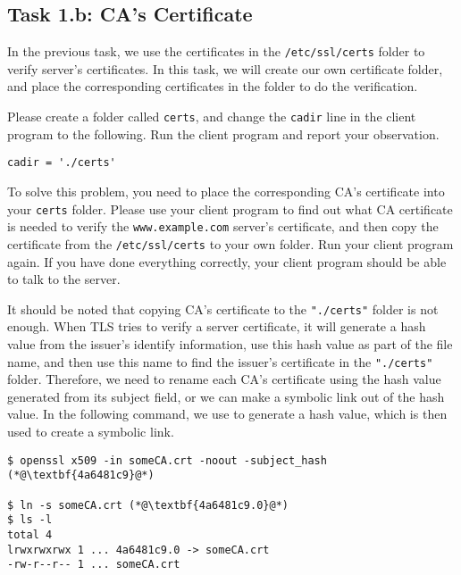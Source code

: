 \subsection{Task 1.b: CA's Certificate}

In the previous task, we use the certificates in
the \texttt{/etc/ssl/certs} folder to verify server's certificates. In this task,
we will create our own certificate folder, and place the corresponding 
certificates in the folder to do the verification.


Please create a folder called \texttt{certs}, and change the 
\texttt{cadir} line in the client program to the following. Run the client program
and report your observation.

\begin{lstlisting}
cadir = './certs'   
\end{lstlisting}


To solve this problem, you need to place the corresponding CA's certificate 
into your \texttt{certs} folder.  Please use your client program
to find out what CA certificate is needed to verify
the \texttt{www.example.com} server's certificate, and then copy
the certificate from the \texttt{/etc/ssl/certs} to your 
own folder. Run your client program again. If you have done everything correctly,
your client program should be able to talk to the server.


It should be noted that copying CA's certificate to the \texttt{"./certs"} folder is
not enough.  When
TLS tries to verify a server certificate, it will generate a hash value from the
issuer's identify information, use this hash value as part of the file name, and
then use this name to find the issuer's certificate in the \texttt{"./certs"} folder.
Therefore, we need to rename each CA's certificate using the hash value generated from its
subject field, or we can make a symbolic link out of the hash value. In the following command,
we use \openssl to generate a hash value, which is then used to create a symbolic link.

\begin{lstlisting}
$ openssl x509 -in someCA.crt -noout -subject_hash
(*@\textbf{4a6481c9}@*)

$ ln -s someCA.crt (*@\textbf{4a6481c9.0}@*)
$ ls -l
total 4
lrwxrwxrwx 1 ... 4a6481c9.0 -> someCA.crt
-rw-r--r-- 1 ... someCA.crt
\end{lstlisting}


